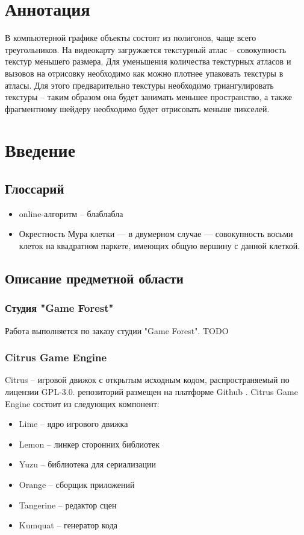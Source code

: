 \documentclass{fefu}
\author{Терехов Д.Е.}
\begin{document}
\makereporttitle
\tableofcontents
\pagebreak
\section*{Аннотация}
В компьютерной графике объекты состоят из полигонов, чаще всего треугольников.
На видеокарту загружается текстурный атлас -- совокупность текстур меньшего размера.
Для уменьшения количества текстурных атласов и вызовов на отрисовку необходимо как можно плотнее упаковать
текстуры в атласы. Для этого предварительно текстуры необходимо триангулировать текстуры -- таким образом
 она будет занимать меньшее пространство, а также фрагментному шейдеру необходимо будет отрисовать меньше пикселей.
\section{Введение}
\subsection{Глоссарий}
\begin{itemize}
    \item online-алгоритм -- блаблабла
    \item Окрестность Мура клетки — в двумерном случае — совокупность восьми клеток на квадратном паркете,
    имеющих общую вершину с данной клеткой.
\end{itemize}
\subsection{Описание предметной области}
\subsubsection{Студия "Game Forest"}
Работа выполняется по заказу студии "Game Forest". TODO
\subsubsection{Citrus Game Engine}
Citrus -- игровой движок с открытым исходным кодом, распространяемый по лицензии GPL-3.0.
репозиторий размещен на платформе Github \cite{CitrusRepo}. Citrus Game Engine
состоит из следующих компонент:
\begin{itemize}
    \item Lime -- ядро игрового движка
    \item Lemon -- линкер сторонних библиотек
    \item Yuzu -- библиотека для сериализации
    \item Orange -- сборщик приложений
    \item Tangerine -- редактор сцен
    \item Kumquat -- генератор кода
\end{itemize}
\end{document}
